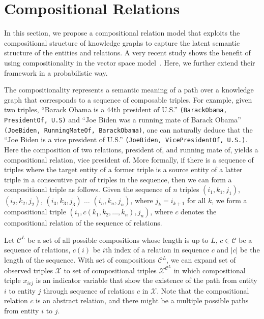 \section{Compositional Relations}
\label{sec:comp}

In this section, we propose a compositional relation model that exploits the compositional structure of
knowledge graphs to capture the latent semantic structure of the entities and relations.
A very recent study shows the benefit of using compositionality in the vector space model~\cite{guu2015traversing}. Here, we further extend their framework in a probabilistic way.

The compositionality represents a semantic meaning of a path over a knowledge graph that corresponds to a
sequence of composable triples.
For example, given two triples, ``Barack Obama is a 44th president of U.S.'' \texttt{(BarackObama, PresidentOf,
U.S)} and ``Joe Biden was a running mate of Barack Obama'' \texttt{(JoeBiden, RunningMateOf, BarackObama)},
one can naturally deduce that the ``Joe Biden is a vice president of U.S.'' \texttt{(JoeBiden, VicePresidentOf, U.S.)}.
Here the composition of two relations, president of, and running mate of, yields a compositional relation,
vice president of.
More formally, if there is a sequence of triples where the target entity of a former triple is a source entity of a
latter triple in a consecutive pair of triples in the sequence, then we can form a compositional triple
as follows.
Given the sequence of $n$ triples
$(i_1, k_1 ,j_1)$,  $(i_2, k_2, j_2)$, $(i_3, k_3, j_3)$ $\dots$ $(i_n, k_n, j_n)$, where $j_{k}=i_{k+1}$ for all $k$,  we form a compositional triple $(i_1, {c}(k_1, k_2, \dots, k_n), j_n)$, where $c$ denotes the compositional
relation of the sequence of relations.

Let $\mathcal{C}^{L}$ be a set of all possible compositions whose length is up to $L$, $c \in \mathcal{C}$
be a sequence of relations, $c(i)$ be $i$th index of a relation in sequence $c$ and $|c|$ be the length of the
sequence. With set of compositions $\mathcal{C}^{L}$, we can expand set of observed triples
$\mathcal{X}$ to set of compositional triples $\mathcal{X}^{\mathcal{C}^{L}}$ in which
compositional triple $x_{icj}$ is an
indicator variable that show the existence of the path from entity $i$ to entity $j$ through sequence
of relations
$c$ in $\mathcal{X}$. Note that the compositional relation $c$ is an abstract relation, and there might be a
multiple possible paths from entity $i$ to $j$.

